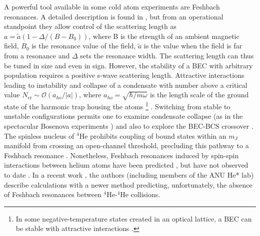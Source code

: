 	A powerful tool available in some cold atom experiments are Feshbach resonances.
	A detailed description is found in \cite{Chin10}, but from an operational standpoint they allow control of the scattering length as $a = \tilde{a}(1-\Delta/(B-B_0))$, where B is the strength of an ambient magnetic field, $B_0$ is the resonance value of the field, $\tilde{a}$ is the value when the field is far from a resonance and $\Delta$ sets the resonance width.
	The scattering length can thus be tuned in size and even in sign.
	However, the stability of a BEC with arbitrary population requires a positive s-wave scattering length.
	Attractive interactions leading to instability and collapse of a condensate with number above a critical value $N_\textrm{cr}\sim\mathcal{O}(a_{ho}/|a|)$, where $a_{ho} = \sqrt{\hbar/m\omega}$ is the length scale of the ground state of the harmonic trap housing the atoms \footnote{In some negative-temperature states created in an optical lattice, a BEC can be stable with attractive interactions \cite{Braun13}.} \cite{PitaevskiiStringari}.
	Switching from stable to unstable configurations permits one to examine condensate collapse (as in the spectacular Bosenova experiments \cite{Cornish00}) and also to explore the BEC-BCS crossover \cite{Bourdel04}.
	The spinless nucleus of $^4$He prohibits coupling of bound states within an $m_J$ manifold from crossing an open-channel threshold, precluding this pathway to a Feshbach resonance \cite{Goosen10}.
	Nonetheless, Feshbach resonances induced by spin-spin interactions between helium atoms have been predicted \cite{Venturi99, Goosen10}, but have not observed to date \cite{Borbely12}.
	In a recent work \cite{Hirsch21}, the authors (including members of the ANU He* lab) describe calculations with a newer method predicting, unfortunately, the absence of Feshbach resonances between $^4$He-$^4$He collisions.
	
